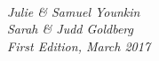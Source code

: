 \begin{titlepage}
\vspace*{1.5in}
\begin{center}
\\
\vspace*{0.5in}
\Large{\slshape Julie \& Samuel Younkin}\\
\vspace{1em}
\Large{\slshape Sarah \& Judd Goldberg}\\
\vspace*{0.5in}
\large{\itshape First Edition, March 2017}




\end{center}

\end{titlepage}
